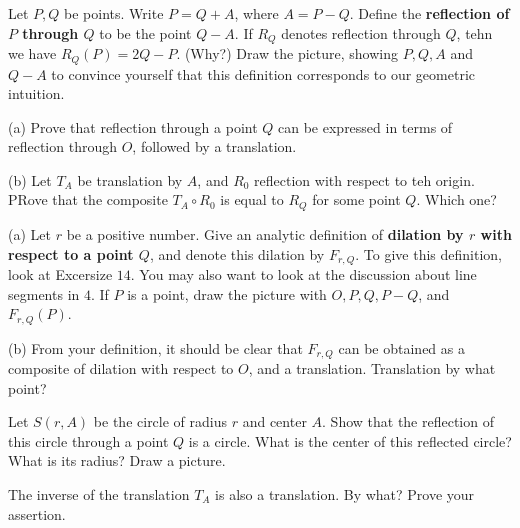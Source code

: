 \begin{tcolorbox}[title=Problem 14, breakable]
    Let $P, Q$ be points. Write $P = Q + A$, where $A = P - Q$. Define 
    the \textbf{reflection of $P$ through $Q$} to be the point $Q - A$.
    If $R_Q$ denotes reflection through $Q$, tehn we have $R_Q(P) = 2 Q - P$.
    (Why?) Draw the picture, showing $P, Q, A$ and $Q - A$ to convince yourself
    that this definition corresponds to our geometric intuition.
\end{tcolorbox}

\begin{tcolorbox}[title=Problem 15, breakable]
    (a) Prove that reflection through a point $Q$ can be expressed in terms 
        of reflection through $O$, followed by a translation.

    (b) Let $T_A$ be translation by $A$, and $R_0$ reflection with respect 
        to teh origin. PRove that the composite $T_A \circ R_0$ is equal 
        to $R_Q$ for some point $Q$. Which one?
\end{tcolorbox}

\begin{tcolorbox}[title=Problem 16, breakable]
    (a) Let $r$ be a positive number.
        Give an analytic definition of \textbf{dilation by $r$ with respect to a point $Q$},
        and denote this dilation by $F_{r, Q}$. To give this definition, look at 
        Excersize $14$. You may also want to look at the discussion about line segments
        in $4$. If $P$ is a point, draw the picture with $O, P, Q, P - Q$, and $F_{r, Q}(P)$.

    (b) From your definition, it should be clear that $F_{r, Q}$ can be obtained as a composite 
        of dilation with respect to $O$, and a translation. Translation by what point?
\end{tcolorbox}

\begin{tcolorbox}[title=Problem 17, breakable]
    Let $S(r, A)$ be the circle of radius $r$ and center $A$.
    Show that the reflection of this circle through a point $Q$ is a circle.
    What is the center of this reflected circle?
    What is its radius?
    Draw a picture.
\end{tcolorbox}

\begin{tcolorbox}[title=Problem 18, breakable]
    The inverse of the translation $T_A$ is also a translation.
    By what? Prove your assertion.
\end{tcolorbox}

